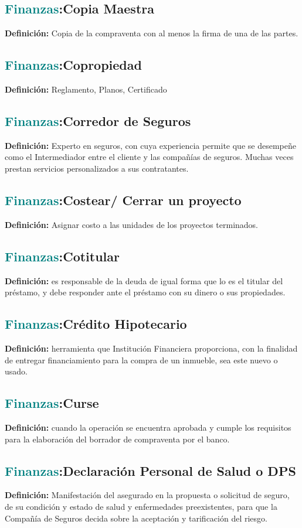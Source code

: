 \documentclass[12pt]{article}
\begin{document}
\subsection{\textcolor{teal}{Finanzas}:{Copia Maestra}}
\textbf{Definición:} Copia de la compraventa con al menos la firma de una de las partes.
\subsection{\textcolor{teal}{Finanzas}:{Copropiedad}}
\textbf{Definición:} Reglamento, Planos, Certificado
\subsection{\textcolor{teal}{Finanzas}:{Corredor de Seguros}}
\textbf{Definición:} Experto en seguros, con cuya experiencia permite que se desempeñe como el Intermediador entre el cliente y las compañías de seguros. Muchas veces prestan servicios personalizados a sus contratantes.
\subsection{\textcolor{teal}{Finanzas}:{Costear/ Cerrar un proyecto}}
\textbf{Definición:} Asignar costo a las unidades de los proyectos terminados.
\subsection{\textcolor{teal}{Finanzas}:{Cotitular}}
\textbf{Definición:} es responsable de la deuda de igual forma que lo es el titular del préstamo, y debe responder ante el préstamo con su dinero o sus propiedades.
\subsection{\textcolor{teal}{Finanzas}:{Crédito Hipotecario}}
\textbf{Definición:} herramienta que Institución Financiera proporciona, con la finalidad de entregar financiamiento para la compra de un inmueble, sea este nuevo o usado.
\subsection{\textcolor{teal}{Finanzas}:{Curse}}
\textbf{Definición:} cuando la operación se encuentra aprobada y cumple los requisitos para la elaboración del borrador de compraventa por el banco.
\subsection{\textcolor{teal}{Finanzas}:{Declaración Personal de Salud o DPS}}
\textbf{Definición:} Manifestación del asegurado en la propuesta o solicitud de seguro, de su condición y estado de salud y enfermedades preexistentes, para que la Compañía de Seguros decida sobre la aceptación y tarificación del riesgo.
\end{document}
